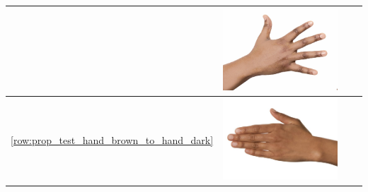 \documentclass[12pt, a4paper]{article}
\begin{document}
\begin{longtable}{|c||c|c|c|}
\begin{minipage}{.29\textwidth}
  \end{minipage} & 
  \begin{minipage}{.29\textwidth}
    \includegraphics[width=\textwidth,height=\textheight,keepaspectratio]{../rc_test/outputs/20170516_proportional_test/hand_dark_to_hand_light.jpg}
  \end{minipage} \\
    \hline  \ref{row:prop_test_hand_brown_to_hand_dark} &
  \begin{minipage}{.29\textwidth}
    \includegraphics[width=\textwidth,height=\textheight,keepaspectratio]{../inputs/hand_brown.jpg}
  \end{minipage} & 
  \begin{minipage}{.29\textwidth}

\end{minipage}
\end{longtable}
\end{document}
